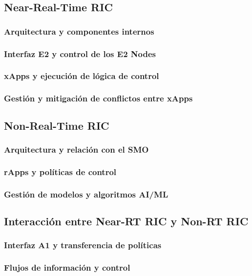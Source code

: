 \documentclass[11pt,a4paper]{article}
\makeatletter
\let\ORIGsubsection\subsection
\def\subsection{\@nobreakfalse\ORIGsubsection}
\let\ORIGsubsubsection\subsubsection
\def\subsubsection{\@nobreakfalse\ORIGsubsubsection}
\makeatother
\begin{document}
\subsection{Near-Real-Time RIC}

\subsubsection{Arquitectura y componentes internos}
\subsubsection{Interfaz E2 y control de los E2 Nodes}
\subsubsection{xApps y ejecución de lógica de control}
\subsubsection{Gestión y mitigación de conflictos entre xApps}

\subsection{Non-Real-Time RIC}

\subsubsection{Arquitectura y relación con el SMO}
\subsubsection{rApps y políticas de control}
\subsubsection{Gestión de modelos y algoritmos AI/ML}

\subsection{Interacción entre Near-RT RIC y Non-RT RIC}

\subsubsection{Interfaz A1 y transferencia de políticas}
\subsubsection{Flujos de información y control}
\end{document}
